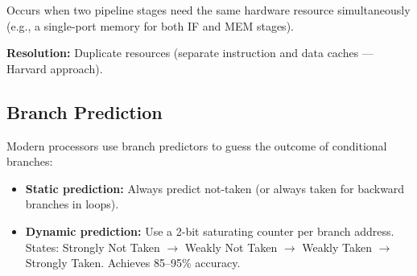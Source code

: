 \begin{definition}
Occurs when two pipeline stages need the same hardware resource simultaneously (e.g., a single-port memory for both IF and MEM stages).
\end{definition}

\textbf{Resolution:} Duplicate resources (separate instruction and data caches — Harvard approach).

\subsection{Branch Prediction}

Modern processors use branch predictors to guess the outcome of conditional branches:
\begin{itemize}
  \item \textbf{Static prediction:} Always predict not-taken (or always taken for backward branches in loops).
  \item \textbf{Dynamic prediction:} Use a 2-bit saturating counter per branch address. States: Strongly Not Taken $\to$ Weakly Not Taken $\to$ Weakly Taken $\to$ Strongly Taken. Achieves 85--95\% accuracy.
\end{itemize}

